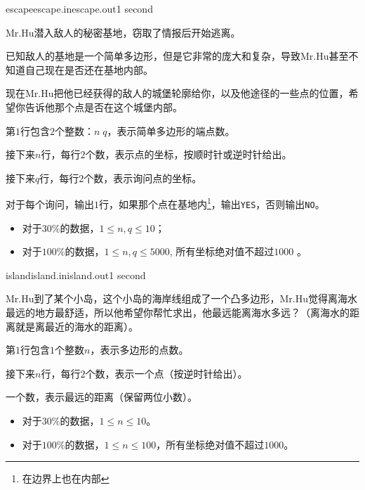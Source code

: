 \documentclass[11pt,a4paper,oneside]{article}
\begin{document}
\begin{problem}{escape}{escape.in}{escape.out}{1 second} 
	
	Mr.Hu潜入敌人的秘密基地，窃取了情报后开始逃离。
	
	已知敌人的基地是一个简单多边形，但是它非常的庞大和复杂，导致Mr.Hu甚至不知道自己现在是否还在基地内部。
	
	现在Mr.Hu把他已经获得的敌人的城堡轮廓给你，以及他途径的一些点的位置，希望你告诉他那个点是否在这个城堡内部。
	
	\InputFile
	
	第$1$行包含$2$个整数：$n \; q$，表示简单多边形的端点数。
	
	接下来$n$行，每行$2$个数，表示点的坐标，按顺时针或逆时针给出。
	
	接下来$q$行，每行$2$个数，表示询问点的坐标。
	
	\OutputFile
	
	对于每个询问，输出$1$行，如果那个点在基地内\footnote{在边界上也在内部}，输出\verb|YES|，否则输出\verb|NO|。
	
	\Example
	
	\begin{example}
	\end{example}
	
	\Note
	
	\begin{itemize}
		\item 对于$30\%$的数据，$1 \leq n, q \leq 10$；
		\item 对于$100\%$的数据，$1 \leq n, q \leq 5000$, 所有坐标绝对值不超过$1000$ 。
	\end{itemize}

\end{problem}

\begin{problem}{island}{island.in}{island.out}{1 second} 
	
	Mr.Hu到了某个小岛，这个小岛的海岸线组成了一个凸多边形，Mr.Hu觉得离海水最远的地方最舒适，所以他希望你帮忙求出，他最远能离海水多远？（离海水的距离就是离最近的海水的距离）。
	
	\InputFile
	
	第$1$行包含$1$个整数$n$，表示多边形的点数。
	
	接下来$n$行，每行$2$个数，表示一个点（按逆时针给出）。
	
	\OutputFile
	
	一个数，表示最远的距离（保留两位小数）。
	
	\Example
	
	\begin{example}
		\exmp{
			4
			0 0
			1 0
			1 1
			0 1.0
		}{
			0.5

	}%
	\end{example}

	\Note
	
	\begin{itemize}
		\item 对于$30\%$的数据，$1 \leq n \leq 10$。
		\item 对于$100\%$的数据，$1 \leq n \leq 100$，所有坐标绝对值不超过$1000$。
	\end{itemize}

\end{problem}
\end{document}

